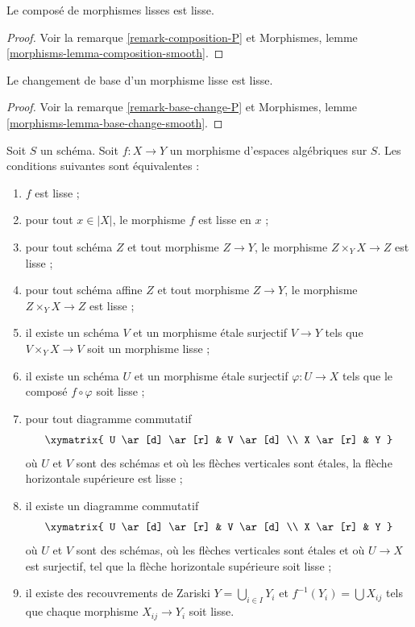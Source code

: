 \begin{lemma}
\label{lemma-composition-smooth}
Le composé de morphismes lisses est lisse.
\end{lemma}

\begin{proof}
Voir la remarque \ref{remark-composition-P} et
Morphismes, lemme \ref{morphisms-lemma-composition-smooth}.
\end{proof}

\begin{lemma}
\label{lemma-base-change-smooth}
Le changement de base d'un morphisme lisse est lisse.
\end{lemma}

\begin{proof}
Voir la remarque \ref{remark-base-change-P} et
Morphismes, lemme \ref{morphisms-lemma-base-change-smooth}.
\end{proof}

\begin{lemma}
\label{lemma-smooth-local}
Soit $S$ un schéma.
Soit $f : X \to Y$ un morphisme d'espaces algébriques sur $S$.
Les conditions suivantes sont équivalentes :
\begin{enumerate}
\item $f$ est lisse ;
\item pour tout $x \in |X|$, le morphisme $f$ est lisse en $x$ ;
\item pour tout schéma $Z$ et tout morphisme $Z \to Y$, le morphisme
$Z \times_Y X \to Z$ est lisse ;
\item pour tout schéma affine $Z$ et tout morphisme
$Z \to Y$, le morphisme $Z \times_Y X \to Z$ est lisse ;
\item il existe un schéma $V$ et un morphisme étale surjectif
$V \to Y$ tels que $V \times_Y X \to V$ soit un morphisme lisse ;
\item il existe un schéma $U$ et un morphisme étale surjectif
$\varphi : U \to X$ tels que le composé $f \circ \varphi$
soit lisse ;
\item pour tout diagramme commutatif
$$
\xymatrix{
U \ar[d] \ar[r] & V \ar[d] \\
X \ar[r] & Y
}
$$
où $U$ et $V$ sont des schémas et où les flèches verticales sont étales,
la flèche horizontale supérieure est lisse ;
\item il existe un diagramme commutatif
$$
\xymatrix{
U \ar[d] \ar[r] & V \ar[d] \\
X \ar[r] & Y
}
$$
où $U$ et $V$ sont des schémas, où les flèches verticales sont étales et où
$U \to X$ est surjectif, tel que la flèche horizontale supérieure soit lisse ;
\item il existe des recouvrements de Zariski $Y = \bigcup_{i \in I} Y_i$
et $f^{-1}(Y_i) = \bigcup X_{ij}$ tels que
chaque morphisme $X_{ij} \to Y_i$ soit lisse.
\end{enumerate}
\end{lemma}

